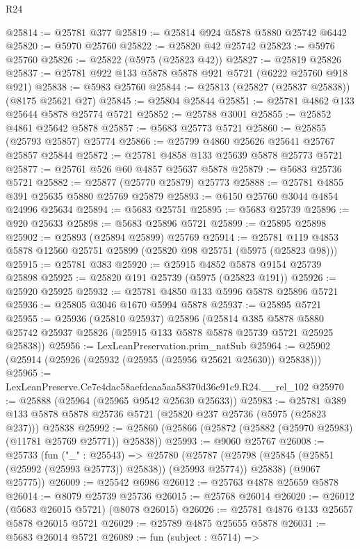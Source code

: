 \begin{lexlean}{R24}
\begin{coremodule}
@25814 := @25781 @377
@25819 := @25814 @924 @5878 @5880 @25742 @6442
@25820 := @5970 @25760
@25822 := @25820 @42 @25742
@25823 := @5976 @25760
@25826 := @25822 (@5975 (@25823 @42))
@25827 := @25819 @25826
@25837 := @25781 @922 @133 @5878 @5878 @921 @5721 (@6222 @25760 @918 @921)
@25838 := @5983 @25760
@25844 := @25813 (@25827 (@25837 @25838)) (@8175 @25621 @27)
@25845 := @25804 @25844
@25851 := @25781 @4862 @133 @25644 @5878 @25774 @5721
@25852 := @25788 @3001
@25855 := @25852 @4861 @25642 @5878
@25857 := @5683 @25773 @5721
@25860 := @25855 (@25793 @25857) @25774
@25866 := @25799 @4860 @25626 @25641 @25767 @25857 @25844
@25872 := @25781 @4858 @133 @25639 @5878 @25773 @5721
@25877 := @25761 @526 @60 @4857 @25637 @5878
@25879 := @5683 @25736 @5721
@25882 := @25877 (@25770 @25879) @25773
@25888 := @25781 @4855 @391 @25635 @5880 @25769 @25879
@25893 := @6150 @25760 @3044 @4854 @24996 @25634
@25894 := @5683 @25751
@25895 := @5683 @25739
@25896 := @920 @25633
@25898 := @5683 @25896 @5721
@25899 := @25895 @25898
@25902 := @25893 (@25894 @25899) @25769
@25914 := @25781 @119 @4853 @5878 @12560 @25751 @25899 (@25820 @98 @25751 (@5975 (@25823 @98)))
@25915 := @25781 @383
@25920 := @25915 @4852 @5878 @9154 @25739 @25898
@25925 := @25820 @191 @25739 (@5975 (@25823 @191))
@25926 := @25920 @25925
@25932 := @25781 @4850 @133 @5996 @5878 @25896 @5721
@25936 := @25805 @3046 @1670 @5994 @5878
@25937 := @25895 @5721
@25955 := @25936
    (@25810 @25937)
    @25896
    (@25814
      @385
      @5878
      @5880
      @25742
      @25937
      @25826
      (@25915 @133 @5878 @5878 @25739 @5721 @25925 @25838))
@25956 := LexLeanPreservation.prim_natSub
@25964 := @25902 (@25914 (@25926 (@25932 (@25955 (@25956 @25621 @25630)) @25838)))
@25965 := LexLeanPreserve.Ce7e4dac58aefdeaa5aa58370d36e91c9.R24.__rel_102
@25970 := @25888 (@25964 (@25965 @9542 @25630 @25633))
@25983 := @25781
    @389
    @133
    @5878
    @5878
    @25736
    @5721
    (@25820 @237 @25736 (@5975 (@25823 @237)))
    @25838
@25992 := @25860 (@25866 (@25872 (@25882 (@25970 @25983) (@11781 @25769 @25771)) @25838))
@25993 := @9060 @25767
@26008 := @25733
    (fun ("_" : @25543) =>
    @25780
      (@25787 (@25798 (@25845 (@25851 (@25992 (@25993 @25773)) @25838)) (@25993 @25774)) @25838)
      (@9067 @25775))
@26009 := @25542 @6986
@26012 := @25763 @4878 @25659 @5878
@26014 := @8079 @25739 @25736
@26015 := @25768 @26014
@26020 := @26012 (@5683 @26015 @5721) (@8078 @26015)
@26026 := @25781 @4876 @133 @25657 @5878 @26015 @5721
@26029 := @25789 @4875 @25655 @5878
@26031 := @5683 @26014 @5721
@26089 := fun (subject : @5714) =>

\end{coremodule}
\end{lexlean}
